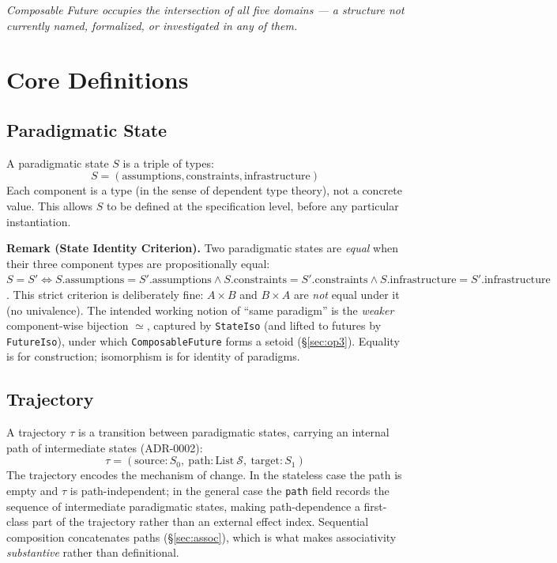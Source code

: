 \documentclass[11pt,a4paper]{article}
\begin{document}
\emph{Composable Future occupies the intersection of all five domains — a structure not currently named, formalized, or investigated in any of them.}

\section{Core Definitions}

\subsection{Paradigmatic State}

A paradigmatic state $S$ is a triple of types:
\[
S = (\text{assumptions}, \text{constraints}, \text{infrastructure})
\]
Each component is a type (in the sense of dependent type theory), not a concrete value. This allows $S$ to be defined at the specification level, before any particular instantiation.

\textbf{Remark (State Identity Criterion).} Two paradigmatic states are
\emph{equal} when their three component types are propositionally equal:
$S = S' \iff S.\text{assumptions} = S'.\text{assumptions} \land
S.\text{constraints} = S'.\text{constraints} \land
S.\text{infrastructure} = S'.\text{infrastructure}$. This strict criterion is
deliberately fine: $A \times B$ and $B \times A$ are \emph{not} equal under it
(no univalence). The intended working notion of ``same paradigm'' is the
\emph{weaker} component-wise bijection $\simeq$, captured by \texttt{StateIso}
(and lifted to futures by \texttt{FutureIso}), under which \texttt{ComposableFuture}
forms a setoid (\S\ref{sec:op3}). Equality is for construction; isomorphism is
for identity of paradigms.

\subsection{Trajectory}

A trajectory $\tau$ is a transition between paradigmatic states, carrying an
internal path of intermediate states (ADR-0002):
\[
\tau = (\text{source} : S_0,\ \text{path} : \text{List}~\mathcal{S},\ \text{target} : S_1)
\]
The trajectory encodes the mechanism of change. In the stateless case the path
is empty and $\tau$ is path-independent; in the general case the \texttt{path}
field records the sequence of intermediate paradigmatic states, making
path-dependence a first-class part of the trajectory rather than an external
effect index. Sequential composition concatenates paths (\S\ref{sec:assoc}),
which is what makes associativity \emph{substantive} rather than definitional.
\end{document}
